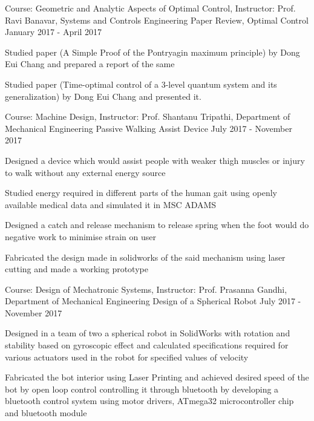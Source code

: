 \begin{cventries}

	\cventry
		{Course: Geometric and Analytic Aspects of Optimal Control, Instructor: Prof. Ravi Banavar, Systems and Controls Engineering}
		{Paper Review, Optimal Control}
		{}
		{January 2017 - April 2017}
		{
		\begin{cvitems}
			\item Studied paper (A Simple Proof of the Pontryagin maximum principle) by Dong Eui Chang and prepared a report of the same
			\item Studied paper (Time-optimal control of a 3-level quantum system and its generalization) by Dong Eui Chang and presented it.
		\end{cvitems}
		}

	\cventry
		{Course: Machine Design, Instructor: Prof. Shantanu Tripathi, Department of Mechanical Engineering}
		{Passive Walking Assist Device}
		{}
		{July 2017 - November 2017}
		{
		\begin{cvitems}
			\item Designed a device which would assist people with weaker thigh muscles or injury to walk without any external energy source
			\item Studied energy required in different parts of the human gait using openly available medical data and simulated it in MSC ADAMS
			\item Designed a catch and release mechanism to release spring when the foot would do negative work to minimise strain on user
			\item Fabricated the design made in solidworks of the said mechanism using laser cutting and made a working prototype
		\end{cvitems}
		}

	\cventry
		{Course: Design of Mechatronic Systems, Instructor: Prof. Prasanna Gandhi, Department of Mechanical Engineering}
		{Design of a Spherical Robot}
		{}
		{July 2017 - November 2017}
		{
		\begin{cvitems}
			\item Designed in a team of two a spherical robot in SolidWorks with rotation and stability based on gyroscopic effect and calculated specifications required for various actuators used in the robot for specified values of velocity
			\item Fabricated the bot interior using Laser Printing and achieved desired speed of the bot by open loop control controlling it through bluetooth by developing a bluetooth control system using motor drivers, ATmega32 microcontroller chip and bluetooth module
		\end{cvitems}
		}


\end{cventries}
